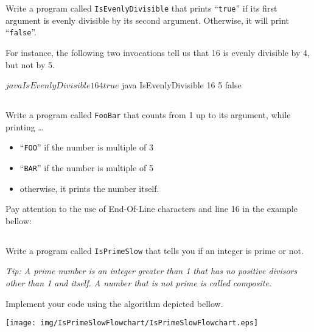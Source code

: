 \documentclass[a4paper, 12pt]{article}
\begin{document}
Write a program called \texttt{IsEvenlyDivisible} that prints ``\texttt{true}''
if its first argument is evenly divisible by its second argument. Otherwise, it
will print ``\texttt{false}''.

For instance, the following two invocations tell us that 16 is evenly divisible
by 4, but not by 5.

\begin{cmd}
$ java IsEvenlyDivisible 16 4
true
$ java IsEvenlyDivisible 16 5
false
\end{cmd}


\subsection{}

Write a program called \texttt{FooBar} that counts from 1 up to its argument,
while printing \ldots

\begin{itemize}
  \item ``\texttt{FOO}'' if the number is multiple of 3
  \item ``\texttt{BAR}'' if the number is multiple of 5
  \item otherwise, it prints the number itself.
\end{itemize}

Pay attention to the use of End-Of-Line characters and line 16 in the example
bellow:



\subsection{}

Write a program called \texttt{IsPrimeSlow} that tells you if an integer is
prime or not.

\textsl{Tip: A \emph{prime} number is an integer greater than 1 that has no
positive divisors other than 1 and itself. A number that is not prime is called
\emph{composite}.}

Implement your code using the algorithm depicted bellow.

\begin{center}
  \texttt{[image: img/IsPrimeSlowFlowchart/IsPrimeSlowFlowchart.eps]}
\end{center}
\vspace{1cm}
\end{document}
